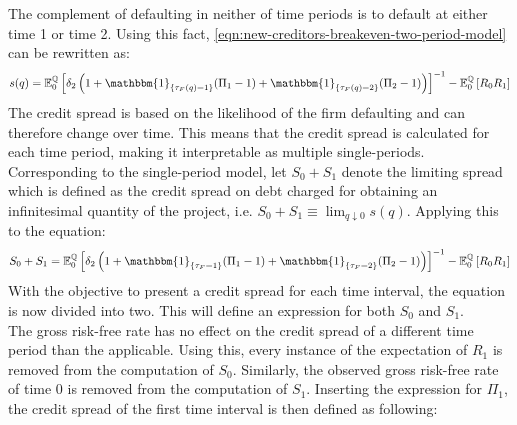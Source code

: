 \documentclass[main.tex]{subfiles}
\begin{document}
        The complement of defaulting in neither of time periods is to default at either time 1 or time 2. Using this fact, \cref{eqn:new-creditors-breakeven-two-period-model} can be rewritten as:
        \begin{equation}
            s(q) =
            \mathbb{E}_{0}^{\rnmeasure}\left[
                \delta_2\left(
                1
                + \mathbbm{1}_{\{\tau_{F}(q) = 1\}}(\Pi_1 - 1)
                + \mathbbm{1}_{\{\tau_{F}(q) = 2\}}(\Pi_2 - 1)
                \right)
            \right]^{-1} - \mathbb{E}_{0}^{\rnmeasure}\left[R_0 R_1\right]
        \end{equation}
        The credit spread is based on the likelihood of the firm defaulting and can therefore change over time.
        This means that the credit spread is calculated for each time period, making it interpretable as multiple single-periods.
        \\
        Corresponding to the single-period model,
        let $S_0 + S_1$ denote the limiting spread which is defined as the credit spread on debt charged for obtaining an infinitesimal quantity of the project,
        i.e. $S_0 + S_1 \equiv \lim_{q \downarrow 0} s(q)$.
        Applying this to the equation:
        \begin{equation}
            S_0 + S_1 =
            \mathbb{E}_{0}^{\rnmeasure}\left[
                \delta_2\left(
                1
                + \mathbbm{1}_{\{\tau_{F} = 1\}}(\Pi_1 - 1)
                + \mathbbm{1}_{\{\tau_{F} = 2\}}(\Pi_2 - 1)
                \right)
            \right]^{-1} - \mathbb{E}_{0}^{\rnmeasure}\left[R_0 R_1\right]
            \label{eqn:aggregate-credit-spread-multi-period}
        \end{equation}
        With the objective to present a credit spread for each time interval, the equation is now divided into two.
        This will define an expression for both $S_0$ and $S_1$.
        \\
        The gross risk-free rate has no effect on the credit spread of a different time period than the applicable.
        Using this, every instance of the expectation of $R_1$ is removed from the computation of $S_0$.
        Similarly, the observed gross risk-free rate of time 0 is removed from the computation of $S_1$.
        Inserting the expression for $\Pi_1$, the credit spread of the first time interval is then defined as following: 
\end{document}
